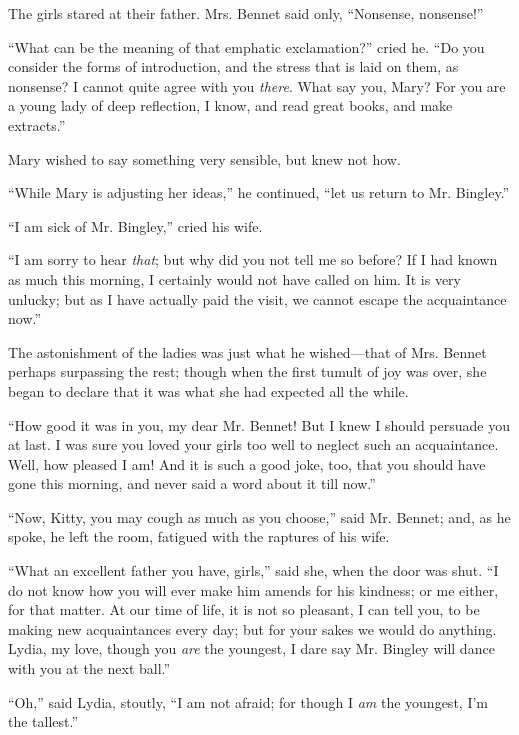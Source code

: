 The girls stared at their father. Mrs. Bennet said only, ``Nonsense, nonsense!''

``What can be the meaning of that emphatic exclamation?'' cried he. ``Do you consider the forms of introduction, and the stress that is laid on them, as nonsense? I cannot quite agree with you \textit{there}. What say you, Mary? For you are a young lady of deep reflection, I know, and read great books, and make extracts.''

Mary wished to say something very sensible, but knew not how.

``While Mary is adjusting her ideas,'' he continued, ``let us return to Mr. Bingley.''

``I am sick of Mr. Bingley,'' cried his wife.

``I am sorry to hear \textit{that}; but why did you not tell me so before? If I had known as much this morning, I certainly would not have called on him. It is very unlucky; but as I have actually paid the visit, we cannot escape the acquaintance now.''

The astonishment of the ladies was just what he wished---that of Mrs. Bennet perhaps surpassing the rest; though when the first tumult of joy was over, she began to declare that it was what she had expected all the while.

``How good it was in you, my dear Mr. Bennet! But I knew I should persuade you at last. I was sure you loved your girls too well to neglect such an acquaintance. Well, how pleased I am! And it is such a good joke, too, that you should have gone this morning, and never said a word about it till now.''

``Now, Kitty, you may cough as much as you choose,'' said Mr. Bennet; and, as he spoke, he left the room, fatigued with the raptures of his wife.

``What an excellent father you have, girls,'' said she, when the door was shut. ``I do not know how you will ever make him amends for his kindness; or me either, for that matter. At our time of life, it is not so pleasant, I can tell you, to be making new acquaintances every day; but for your sakes we would do anything. Lydia, my love, though you \textit{are} the youngest, I dare say Mr. Bingley will dance with you at the next ball.''

``Oh,'' said Lydia, stoutly, ``I am not afraid; for though I \textit{am} the youngest, I'm the tallest.''

